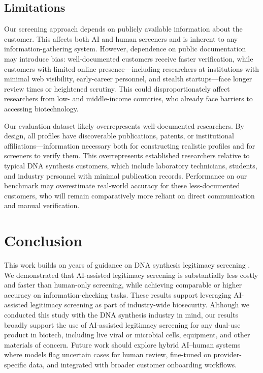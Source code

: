 \documentclass[utf8]{FrontiersinHarvard}
\begin{document}
\subsection{Limitations}

Our screening approach depends on publicly available information about the customer. This affects both AI and human screeners and is inherent to any information-gathering system. However, dependence on public documentation may introduce bias: well-documented customers receive faster verification, while customers with limited online presence---including researchers at institutions with minimal web visibility, early-career personnel, and stealth startups---face longer review times or heightened scrutiny. This could disproportionately affect researchers from low- and middle-income countries, who already face barriers to accessing biotechnology.

Our evaluation dataset likely overrepresents well-documented researchers. By design, all profiles have discoverable publications, patents, or institutional affiliations---information necessary both for constructing realistic profiles and for screeners to verify them. This overrepresents established researchers relative to typical DNA synthesis customers, which include laboratory technicians, students, and industry personnel with minimal publication records. Performance on our benchmark may overestimate real-world accuracy for these less-documented customers, who will remain comparatively more reliant on direct communication and manual verification.

\section{Conclusion}

This work builds on years of guidance on DNA synthesis legitimacy screening \citep{CarterFriedman2015, AlexanianCarter2024, IGSC2024}. We demonstrated that AI-assisted legitimacy screening is substantially less costly and faster than human-only screening, while achieving comparable or higher accuracy on information-checking tasks. These results support leveraging AI-assisted legitimacy screening as part of industry-wide biosecurity. Although we conducted this study with the DNA synthesis industry in mind, our results broadly support the use of AI-assisted legitimacy screening for any dual-use product in biotech, including live viral or microbial cells, equipment, and other materials of concern. Future work should explore hybrid AI--human systems where models flag uncertain cases for human review, fine-tuned on provider-specific data, and integrated with broader customer onboarding workflows.
\end{document}
